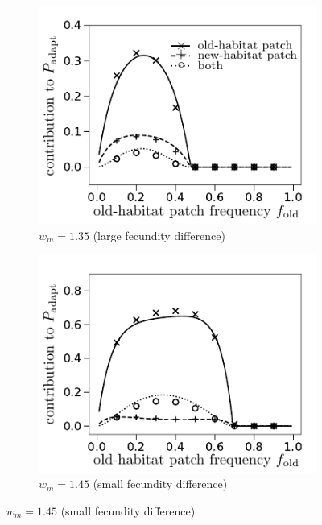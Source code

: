 \documentclass[11pt]{article}
\begin{document}
\begin{figure}[t!]
	\centering
	\begin{subfigure}{.5\textwidth}
 		 \centering
 		 \includegraphics[width=\linewidth]{fig4a.pdf}
  		\caption{$w_m = 1.35$ (large fecundity difference)}
	\end{subfigure}%
	\begin{subfigure}{.5\textwidth}
  		\centering
  		\includegraphics[width=\linewidth]{fig4b.pdf}
  		\caption{$w_m = 1.45$ (small fecundity difference)}
	\end{subfigure}

\end{figure}
\end{document}
